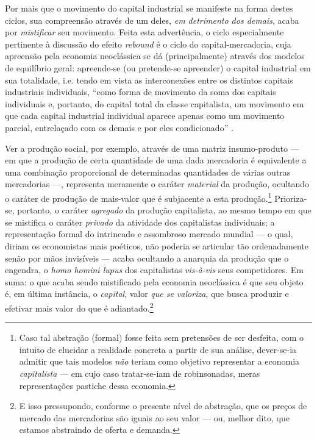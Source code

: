Por mais que o movimento do capital industrial se manifeste na forma destes ciclos, sua compreensão através de um deles, \textit{em detrimento dos demais}, acaba por \textit{mistificar} seu movimento. Feita esta advertência, o ciclo especialmente pertinente à discussão do efeito \textit{rebound} é o ciclo do capital-mercadoria, cuja apreensão pela economia neoclássica se dá (principalmente) através dos modelos de equilíbrio geral: apreende-se (ou pretende-se apreender) o capital industrial em sua totalidade, i.e. tendo em vista as interconexões entre os distintos capitais industriais individuais, ``como forma de movimento da soma dos capitais individuais e, portanto, do capital total da classe capitalista, um movimento em que cada capital industrial individual aparece apenas como um movimento parcial, entrelaçado com os demais e por eles condicionado'' \parencite[p. 175]{Marx2014}. 

Ver a produção social, por exemplo, através de uma matriz insumo-produto --- em que a produção de certa quantidade de uma dada mercadoria é equivalente a uma combinação proporcional de determinadas quantidades de várias outras mercadorias ---, representa meramente o caráter \textit{material} da produção, ocultando o caráter de produção de mais-valor que é subjacente a esta produção.\footnote{Caso tal abstração (formal) fosse feita sem pretensões de ser desfeita, com o intuito de elucidar a realidade concreta a partir de sua análise, dever-se-ia admitir que tais modelos \textit{não} teriam como objetivo representar a economia \textit{capitalista} --- em cujo caso tratar-se-iam de robinsonadas, meras representações pastiche dessa economia.} Prioriza-se, portanto, o caráter \textit{agregado} da produção capitalista, ao mesmo tempo em que se mistifica o caráter \textit{privado} da atividade dos capitalistas individuais; a representação formal  do intrincado e assombroso mercado mundial --- o qual, diriam os economistas mais poéticos, não poderia se articular tão ordenadamente senão por mãos invisíveis --- acaba ocultando a anarquia da produção que o engendra, o \textit{homo homini lupus} dos capitalistas \textit{vis-à-vis} seus competidores. Em suma: o que acaba sendo mistificado pela economia neoclássica é que seu objeto é, em última instância, o \textit{capital}, valor \textit{que se valoriza}, que busca produzir e efetivar mais valor do que é adiantado.\footnote{E isso pressupondo, conforme o presente nível de abstração, que os preços de mercado das mercadorias são iguais ao seu valor --- ou, melhor dito, que estamos abstraindo de oferta e demanda.}



